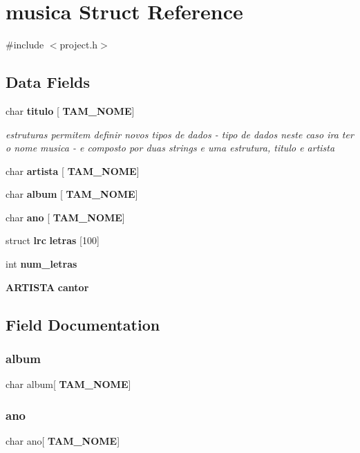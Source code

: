 \section{musica Struct Reference}
\label{structmusica}


{\ttfamily \#include $<$project.\+h$>$}

\subsection*{Data Fields}
\begin{DoxyCompactItemize}
\item 
char \textbf{ titulo} [\textbf{ T\+A\+M\+\_\+\+N\+O\+ME}]
\begin{DoxyCompactList}\small\item\em estruturas permitem definir novos tipos de dados -\/ tipo de dados neste caso ira ter o nome musica -\/ e composto por duas strings e uma estrutura, titulo e artista \end{DoxyCompactList}\item 
char \textbf{ artista} [\textbf{ T\+A\+M\+\_\+\+N\+O\+ME}]
\item 
char \textbf{ album} [\textbf{ T\+A\+M\+\_\+\+N\+O\+ME}]
\item 
char \textbf{ ano} [\textbf{ T\+A\+M\+\_\+\+N\+O\+ME}]
\item 
struct \textbf{ lrc} \textbf{ letras} [100]
\item 
int \textbf{ num\+\_\+letras}
\item 
\textbf{ A\+R\+T\+I\+S\+TA} \textbf{ cantor}
\end{DoxyCompactItemize}


\subsection{Field Documentation}
\mbox{\label{structmusica_a5e90504f1995d65d2fe8574737998255}} 
\subsubsection{album}
{\footnotesize\ttfamily char album[\textbf{ T\+A\+M\+\_\+\+N\+O\+ME}]}

\mbox{\label{structmusica_a425a18cdc020d8ccc82c46c220d521f9}} 
\subsubsection{ano}
{\footnotesize\ttfamily char ano[\textbf{ T\+A\+M\+\_\+\+N\+O\+ME}]}

